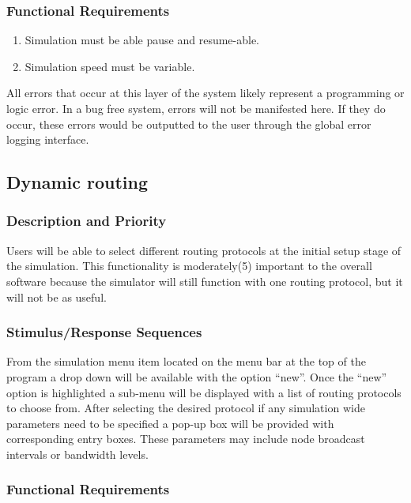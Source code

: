 \documentclass[a4paper,11pt,titlepage]{article}
\begin{document}
\subsubsection{Functional Requirements}

\begin{enumerate}[{\bf {REQ} 1}]
 \item Simulation must be able pause and resume-able.
 \item Simulation speed must be variable.
\end{enumerate}

\begin{description}[\breaklabel]
  \item[Errors] All errors that occur at this layer of the system likely represent a programming
or logic error. In a bug free system, errors will not be manifested here. If they do occur,
these errors would be outputted to the user through the global error logging interface.
\end{description}

\subsection{Dynamic routing}
\subsubsection{Description and Priority}
Users will be able to select different routing protocols at the initial setup stage of
the simulation. This functionality is moderately(5) important to the overall software
because the simulator will still function with one routing protocol, but it will not be as
useful.
\subsubsection{Stimulus/Response Sequences}
From the simulation menu item located on the menu bar at the top of the program a
drop down will be available with the option “new”. Once the “new” option is highlighted
a sub-menu will be displayed with a list of routing protocols to choose from. After
selecting the desired protocol if any simulation wide parameters need to be specified a
pop-up box will be provided with corresponding entry boxes. These parameters may
include node broadcast intervals or bandwidth levels.
\subsubsection{Functional Requirements}
\end{document}
